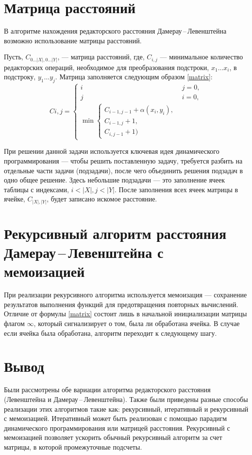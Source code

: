 \section{Матрица расстояний}
В алгоритме нахождения редакторского расстояния Дамерау\,--\,Левенштейна возможно использование матрицы расстояний.

Пусть, $C_{0 \dots |X|, 0 \dots |Y|}$, --- матрица расстояний, где, $C_{i, j}$ --- минимальное количество редакторских операций, необходимое для преобразования подстроки, $x_1\dots x_i$, в подстроку, $y_1 \dots y_j$. Матрица заполняется следующим образом \ref{matrix}:
\begin{equation}\label{matrix}
	C{i, j} = 
	\begin{cases}
		i & j = 0, \\
		j & i = 0, \\
		\min 
		\begin{cases}
			C_{i - 1, j - 1} + \alpha(x_i, y_i), \\
			C_{i - 1, j} + 1, \\
			C_{i, j - 1} + 1)
		\end{cases}
	\end{cases}
\end{equation}

При решении данной задачи используется ключевая идея динамического программирования --- чтобы решить поставленную задачу, требуется разбить на отдельные части задачи (подзадачи), после чего объединить решения подзадач в одно общее решение. Здесь небольшие подзадачи --- это заполнение ячеек таблицы с индексами, $i < |X|, j < |Y|$. После заполнения всех ячеек матрицы в ячейке, $C_{|X|, |Y|}$, будет записано искомое расстояние.



\section{Рекурсивный алгоритм расстояния Дамерау\,--\,Левенштейна с мемоизацией}
При реализации рекурсивного алгоритма используется мемоизация --- сохранение результатов выполнения функций для предотвращения повторных вычислений. Отличие от формулы \ref{matrix} состоит лишь в начальной инициализации матрицы флагом $\infty$, который сигнализирует о том, была ли обработана ячейка. В случае если ячейка была обработана, алгоритм переходит к следующему шагу. 


\section{Вывод}
Были рассмотрены обе вариации алгоритма редакторского расстояния (Левенштейна и Дамерау\,--\,Левенштейна). Также были приведены разные способы реализации этих алгоритмов такие как: рекурсивный, итеративный и рекурсивный с мемоизацией. Итеративный может быть реализован с помощью парадигм динамического программирования или матрицей расстояния. Рекурсивный с мемоизацией позволяет ускорить обычный рекурсивный алгоритм за счет матрицы, в которой промежуточные подсчеты.
